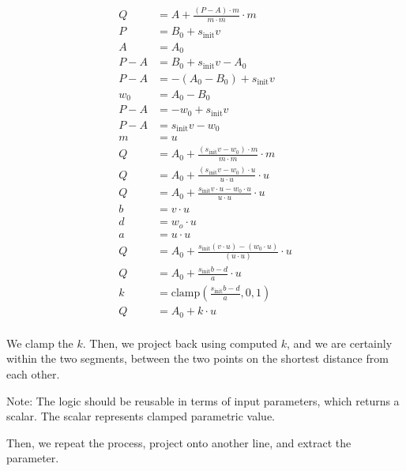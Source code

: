 \documentclass{article}
\begin{document}
\begin{align*}
    Q &= A + \frac{(P - A) \cdot m}{m \cdot m} \cdot m \\
    P &= B_0 + s_{\text{init}} v  \\
    A &= A_0 \\
    P - A &= B_0 + s_{\text{init}} v - A_0 \\
    P - A &= -(A_0 - B_0) + s_{\text{init}} v \\
    w_0 &= A_0 - B_0 \\
    P - A &= - w_0 + s_{\text{init}} v \\
    P - A &= s_{\text{init}} v - w_0 \\
    m &= u \\
    Q &= A_0 + \frac{(s_{\text{init}} v - w_0) \cdot m}{m \cdot m} \cdot m \\
    Q &= A_0 + \frac{(s_{\text{init}} v - w_0) \cdot u}{u \cdot u} \cdot u \\
    Q &= A_0 + \frac{s_{\text{init}} v \cdot u - w_0 \cdot u}{u \cdot u} \cdot u \\
    b &= v \cdot u \\
    d &= w_o \cdot u  \\
    a &= u \cdot u \\
    Q &= A_0 + \frac{s_{\text{init}} (v \cdot u) - (w_0 \cdot u)}{(u \cdot u)} \cdot u \\
    Q &= A_0 + \frac{s_{\text{init}} b - d}{a} \cdot u \\
    k &= \text{clamp}(\frac{s_{\text{init}} b - d}{a}, 0, 1) \\
    Q &= A_0 + k \cdot u \\
\end{align*}

We clamp the $k$. Then, we project back using computed $k$, and we are certainly within the two segments, between the two points on the shortest distance from each other.

Note: The logic should be reusable in terms of input parameters, which returns a scalar. The scalar represents clamped parametric value.

Then, we repeat the process, project onto another line, and extract the parameter.
\end{document}

